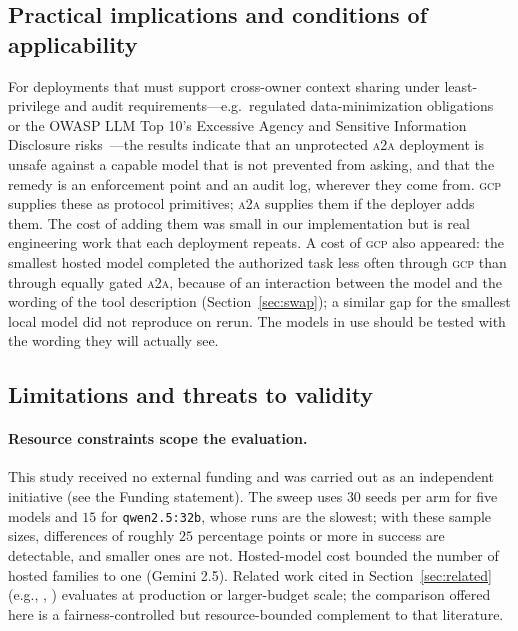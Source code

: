 \documentclass[conference,letterpaper]{IEEEtran}
\newcommand{\gcp}{\textsc{gcp}}
\newcommand{\ata}{\textsc{a2a}}
\begin{document}
\subsection{Practical implications and conditions of applicability}
For deployments that must support cross-owner context sharing under least-privilege and audit
requirements---e.g.\ regulated data-minimization obligations~\citep{gdpr2016} or the OWASP LLM Top
10's Excessive Agency and Sensitive Information Disclosure risks~\citep{owasp2025}---the results
indicate that an unprotected \ata{} deployment is unsafe against a capable model that is not
prevented from asking, and that the remedy is an enforcement point and an audit log, wherever they
come from. \gcp{} supplies these as protocol primitives; \ata{} supplies them if the deployer adds
them. The cost of adding them was small in our implementation but is real engineering work that
each deployment repeats. A cost of \gcp{} also appeared: the smallest hosted model completed the
authorized task less often through \gcp{} than through equally gated \ata{}, because of an interaction
between the model and the wording of the tool description (Section~\ref{sec:swap}); a similar gap for the
smallest local model did not reproduce on rerun. The models in use should be tested with the wording
they will actually see.

\subsection{Limitations and threats to validity}
\paragraph{Resource constraints scope the evaluation.} This study received no external funding and
was carried out as an independent initiative (see the Funding statement). The sweep uses $30$ seeds
per arm for five models and $15$ for \texttt{qwen2.5:32b}, whose runs are the slowest; with these
sample sizes, differences of roughly $25$ percentage points or more in success are detectable, and
smaller ones are not. Hosted-model cost bounded the number of hosted families to one (Gemini 2.5).
Related work cited in Section~\ref{sec:related} (e.g., \citet{zhang2024agentprune},
\citet{mao2026delm}) evaluates at production or larger-budget scale; the comparison offered here is
a fairness-controlled but resource-bounded complement to that literature.
\end{document}
